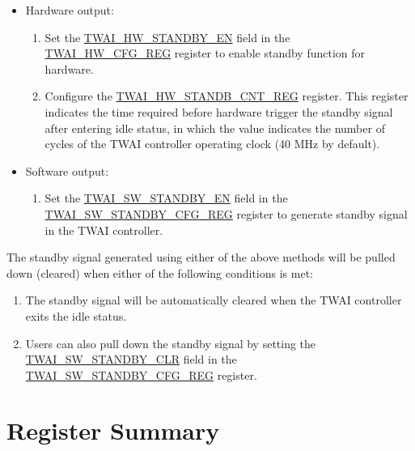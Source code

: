 \documentclass[main\_\_EN.tex]{subfiles}
\begin{document}
\begin{itemize}
    \item Hardware output:
    \begin{enumerate}
        \item Set the \hyperref[fielddesc:TWAIHWSTANDBYEN]{TWAI\_HW\_STANDBY\_EN} field in the \hyperref[regdesc:TWAIHWCFGREG]{TWAI\_HW\_CFG\_REG} register to enable standby function for hardware.
        \item Configure the \hyperref[regdesc:TWAIHWSTANDBYCNTREG]{TWAI\_HW\_STANDB\_CNT\_REG} register. This register indicates the time required before hardware trigger the standby signal after entering idle status, in which the value indicates the number of cycles of the TWAI controller operating clock (40 MHz by default).
    \end{enumerate}
    \item Software output:
    \begin{enumerate}
        \item Set the \hyperref[fielddesc:TWAISWSTANDBYEN]{TWAI\_SW\_STANDBY\_EN} field in the \hyperref[regdesc:TWAISWSTANDBYCFGREG]{TWAI\_SW\_STANDBY\_CFG\_REG} register to generate standby signal in the TWAI controller.
    \end{enumerate}
\end{itemize}

The standby signal generated using either of the above methods will be pulled down (cleared) when either of the following conditions is met:
\begin{enumerate}
    \item The standby signal will be automatically cleared when the TWAI controller exits the idle status.
    \item Users can also pull down the standby signal by setting the \hyperref[fielddesc:TWAISWSTANDBYCLR]{TWAI\_SW\_STANDBY\_CLR} field in the \hyperref[regdesc:TWAISWSTANDBYCFGREG]{TWAI\_SW\_STANDBY\_CFG\_REG} register.
\end{enumerate}




\clearpage
\hypertarget{twai-reg-summ}{}
\section{Register Summary}
\label{sec:twai-reg-summ}
\end{document}
